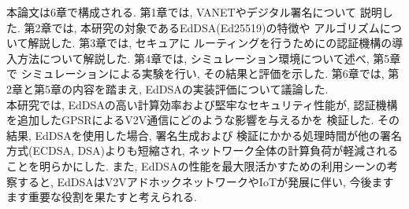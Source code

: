 本論文は6章で構成される. 第1章では, VANETやデジタル署名について
説明した. 第2章では, 本研究の対象であるEdDSA(Ed25519)の特徴や
アルゴリズムについて解説した. 第3章では, セキュアに
ルーティングを行うためにの認証機構の導入方法について解説した. 
第4章では, シミュレーション環境について述べ, 第5章で
シミュレーションによる実験を行い, その結果と評価を示した. 
第6章では, 第2章と第5章の内容を踏まえ, EdDSAの実装評価について議論した. \\
\indent 本研究では, EdDSAの高い計算効率および堅牢なセキュリティ性能が, 
認証機構を追加したGPSRによるV2V通信にどのような影響を与えるかを
検証した. その結果, EdDSAを使用した場合, 署名生成および
検証にかかる処理時間が他の署名方式(ECDSA, DSA)よりも短縮され, 
ネットワーク全体の計算負荷が軽減されることを明らかにした. 
また, EdDSAの性能を最大限活かすための利用シーンの考察すると, 
EdDSAはV2VアドホックネットワークやIoTが発展に伴い, 
今後ますます重要な役割を果たすと考えられる.\\